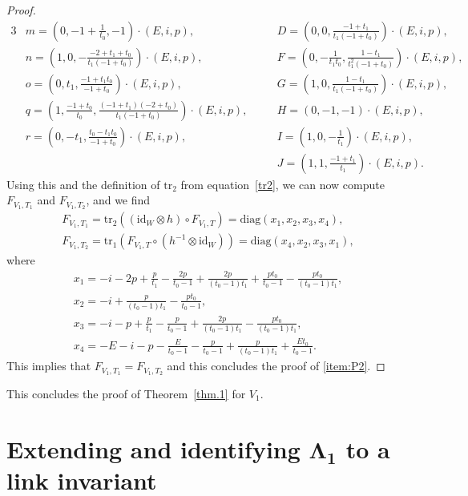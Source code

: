 \documentclass[pdftex]{sigma}
\numberwithin{equation}{section}
\theoremstyle{definition}
\begin{document}
\begin{proof}
\begin{alignat*}{3}
&m = \left(0, -1 + \frac{1}{t_0}, -1 \right) \cdot (E,i,p) ,\qquad &&
D = \left(0, 0, \frac{-1+t_1}{t_1(-1+t_0)}\right) \cdot (E,i,p) ,&\\
&n = \left(1, 0, -\frac{-2+t_1+t_0}{t_1(-1+t_0)} \right) \cdot (E,i,p) ,\qquad &&
F = \left(0, -\frac{1}{t_1 t_0}, \frac{1-t_1}{t_1^2(-1+t_0)} \right) \cdot (E,i,p) ,&\\
&o = \left(0, t_1, \frac{-1+t_1 t_0}{-1+t_0} \right) \cdot (E,i,p) ,\qquad&&
G = \left(1, 0, \frac{1-t_1}{t_1(-1+t_0)}\right) \cdot (E,i,p) ,&\\
&q = \left(1, \frac{-1+t_0}{t_0}, \frac{(-1+t_1)(-2+t_0)}{t_1(-1+t_0)}\right) \cdot (E,i,p) ,\quad &&
H = (0, -1, -1) \cdot (E,i,p) ,&\\
&r = \left(0, -t_1, \frac{t_0-t_1 t_0}{-1+t_0} \right) \cdot (E,i,p) ,\qquad &&
I = \left(1, 0, -\frac{1}{t_1}\right) \cdot (E,i,p) ,&\\
&&& J = \left(1, 1, \frac{-1+t_1}{t_1}\right) \cdot (E,i,p) .&
\end{alignat*}
Using this and the definition of $\mathrm{tr}_2$ from equation~\eqref{tr2}, we can now
compute $F_{V_1,T_1}$ and $F_{V_1,T_2}$, and we find
\begin{gather*}
F_{V_1,T_1}  = \mathrm{tr}_{2} ((\mathrm{id}_W \otimes h) \circ F_{V_1,T})
= \mathrm{diag}(x_1,x_2,x_3,x_4), \\
F_{V_1,T_2}  = \mathrm{tr}_{1} (F_{V_1,T}
\circ (h^{-1} \otimes \mathrm{id}_W)) = \mathrm{diag}(x_4,x_2,x_3,x_1),
\end{gather*}
where
\begin{gather*}
 x_1  = - i - 2 p + \frac{p}{t_1} - \frac{2 p}{t_0-1}
+ \frac{2 p}{(t_0-1)t_1} + \frac{p t_0}{t_0-1} - \frac{p t_0}{(t_0-1)t_1},
\\
x_2  = - i + \frac{p}{(t_0-1)t_1} - \frac{p t_0}{t_0-1},
\\
x_3  = - i - p + \frac{p}{t_1} - \frac{p}{t_0-1} + \frac{2 p}{(t_0-1)t_1}
- \frac{p t_0}{(t_0-1)t_1},
\\
x_4  = -E - i - p - \frac{E}{t_0-1} - \frac{p}{t_0-1} + \frac{p}{(t_0-1)t_1}
+ \frac{E t_0}{t_0-1}.
\end{gather*}
This implies that $F_{V_1,T_1}=F_{V_1,T_2}$ and this
concludes the proof of \eqref{item:P2}.
\end{proof}

This concludes the proof of Theorem~\ref{thm.1} for $V_1$.

\section[Extending and identifying Lambda\_1 to a link invariant]{Extending and identifying $\boldsymbol{\Lambda_1}$ to a link invariant}
\label{sec:L1}
\end{document}
